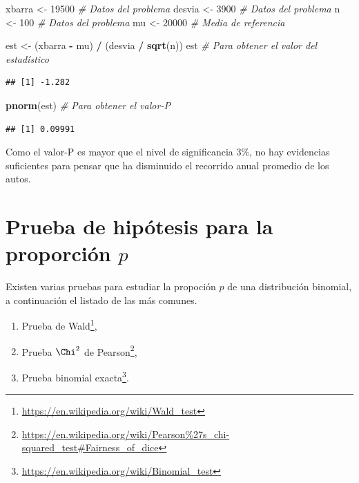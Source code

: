 \documentclass[10pt,]{krantz}
\makeatletter
\newenvironment{Shaded}{\begin{snugshade}}{\end{snugshade}}
\newcommand{\KeywordTok}[1]{\textcolor[rgb]{0.13,0.29,0.53}{\textbf{#1}}}
\newcommand{\DecValTok}[1]{\textcolor[rgb]{0.00,0.00,0.81}{#1}}
\newcommand{\StringTok}[1]{\textcolor[rgb]{0.31,0.60,0.02}{#1}}
\newcommand{\CommentTok}[1]{\textcolor[rgb]{0.56,0.35,0.01}{\textit{#1}}}
\newcommand{\OperatorTok}[1]{\textcolor[rgb]{0.81,0.36,0.00}{\textbf{#1}}}
\newcommand{\NormalTok}[1]{#1}
\providecommand{\tightlist}{%
  \setlength{\itemsep}{0pt}\setlength{\parskip}{0pt}}
\renewcommand{\href}[2]{#2\footnote{\url{#1}}}
\newenvironment{kframe}{%
\medskip{}
\setlength{\fboxsep}{.8em}
 \def\at@end@of@kframe{}%
 \ifinner\ifhmode%
  \def\at@end@of@kframe{\end{minipage}}%
  \begin{minipage}{\columnwidth}%
 \fi\fi%
 \def\FrameCommand##1{\hskip\@totalleftmargin \hskip-\fboxsep
 \colorbox{shadecolor}{##1}\hskip-\fboxsep
     \hskip-\linewidth \hskip-\@totalleftmargin \hskip\columnwidth}%
 \MakeFramed {\advance\hsize-\width
   \@totalleftmargin\z@ \linewidth\hsize
   \@setminipage}}%
 {\par\unskip\endMakeFramed%
 \at@end@of@kframe}
\renewenvironment{Shaded}{\begin{kframe}}{\end{kframe}}
\makeatother
\begin{document}
\begin{Shaded}
\begin{Highlighting}[]
\NormalTok{xbarra <-}\StringTok{ }\DecValTok{19500}  \CommentTok{# Datos del problema}
\NormalTok{desvia <-}\StringTok{ }\DecValTok{3900}   \CommentTok{# Datos del problema}
\NormalTok{n <-}\StringTok{ }\DecValTok{100}         \CommentTok{# Datos del problema}
\NormalTok{mu <-}\StringTok{ }\DecValTok{20000}      \CommentTok{# Media de referencia}

\NormalTok{est <-}\StringTok{ }\NormalTok{(xbarra }\OperatorTok{-}\StringTok{ }\NormalTok{mu) }\OperatorTok{/}\StringTok{ }\NormalTok{(desvia }\OperatorTok{/}\StringTok{ }\KeywordTok{sqrt}\NormalTok{(n))}
\NormalTok{est  }\CommentTok{# Para obtener el valor del estadístico}
\end{Highlighting}
\end{Shaded}

\begin{verbatim}
## [1] -1.282
\end{verbatim}

\begin{Shaded}
\begin{Highlighting}[]
\KeywordTok{pnorm}\NormalTok{(est)  }\CommentTok{# Para obtener el valor-P}
\end{Highlighting}
\end{Shaded}

\begin{verbatim}
## [1] 0.09991
\end{verbatim}

Como el valor-P es mayor que el nivel de significancia 3\%, no hay
evidencias suficientes para pensar que ha disminuido el recorrido anual
promedio de los autos.

\section{\texorpdfstring{Prueba de hipótesis para la proporción
\(p\)}{Prueba de hipótesis para la proporción p}}\label{prueba-de-hipotesis-para-la-proporcion-p}

Existen varias pruebas para estudiar la propoción \(p\) de una
distribución binomial, a continuación el listado de las más comunes.

\begin{enumerate}
\def\labelenumi{\arabic{enumi}.}
\tightlist
\item
  Prueba de \href{https://en.wikipedia.org/wiki/Wald_test}{Wald},
\item
  Prueba \(\Chi^2\) de
  \href{https://en.wikipedia.org/wiki/Pearson\%27s_chi-squared_test\#Fairness_of_dice}{Pearson},
\item
  Prueba \href{https://en.wikipedia.org/wiki/Binomial_test}{binomial
  exacta}.
\end{enumerate}
\end{document}
